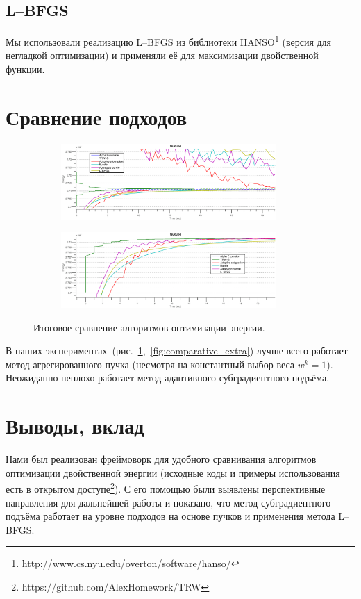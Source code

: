 \documentclass{article}
\begin{document}
\subsection{L--BFGS}
Мы использовали реализацию L--BFGS из библиотеки HANSO\footnote{http://www.cs.nyu.edu/overton/software/hanso/} (версия для негладкой оптимизации) и применяли её для максимизации двойственной функции.

\section{Сравнение подходов}
\begin{figure}
    \centering
    \begin{subfigure}[t]{\textwidth}
            \centering
            \includegraphics[width=0.9\textwidth]{comparative_small_tsukuba.eps}
    \end{subfigure}
    \begin{subfigure}[t]{\textwidth}
            \centering
            \includegraphics[width=0.9\textwidth]{comparative_tsukuba.eps}
    \end{subfigure}
    \caption{Итоговое сравнение алгоритмов оптимизации энергии.}
    \label{fig:comparative}
\end{figure}
В наших экспериментах~(рис.~\ref{fig:comparative},~\ref{fig:comparative_extra}) лучше всего работает метод агрегированного пучка (несмотря на константный выбор веса $w^k = 1$). Неожиданно неплохо работает метод адаптивного субградиентного подъёма.

\section{Выводы, вклад}
Нами был реализован фреймоворк для удобного сравнивания алгоритмов оптимизации двойственной энергии (исходные коды и примеры использования есть в открытом доступе\footnote{https://github.com/AlexHomework/TRW}). С его помощью были выявлены перспективные направления для дальнейшей работы и показано, что метод субградиентного подъёма работает на уровне подходов на основе пучков и применения метода L--BFGS.
\end{document}
